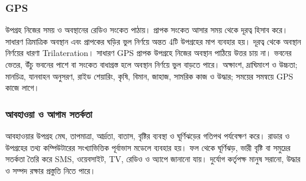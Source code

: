 \subsubsection{GPS}
উপগ্রহ নিজের সময় ও অবস্থানের রেডিও সংকেত পাঠায়। প্রাপক সংকেত আসার সময় থেকে দূরত্ব হিসাব করে। সাধারণ ত্রিমাত্রিক অবস্থান এবং প্রাপকের ঘড়ির ভুল নির্ণয়ে অন্তত 4টি উপগ্রহের মাপ ব্যবহার হয়। দূরত্ব থেকে অবস্থান নির্ণয়ের ধারণা Trilateration। সাধারণ GPS প্রাপক উপগ্রহে নিজের অবস্থান পাঠিয়ে উত্তর চায় না। ভবনের ভেতর, উঁচু ভবনের পাশে বা সংকেত বাধাগ্রস্ত হলে অবস্থান নির্ণয়ে ভুল বাড়তে পারে।
অক্ষাংশ, দ্রাঘিমাংশ ও উচ্চতা; মানচিত্র, যানবাহন অনুসরণ, রাইড শেয়ারিং, কৃষি, বিমান, জাহাজ, সামরিক কাজ ও উদ্ধার; সময়ের সমন্বয়ে GPS কাজে লাগে।
\subsubsection{আবহাওয়া ও আগাম সতর্কতা}
আবহাওয়ার উপগ্রহ মেঘ, তাপমাত্রা, আর্দ্রতা, বাতাস, বৃষ্টির ব্যবস্থা ও ঘূর্ণিঝড়ের গতিপথ পর্যবেক্ষণ করে। রাডার ও উপগ্রহের তথ্য কম্পিউটারের সংখ্যাভিত্তিক পূর্বাভাস মডেলে ব্যবহার হয়। ফল থেকে ঘূর্ণিঝড়, ভারী বৃষ্টি বা সমুদ্রের সতর্কতা তৈরি করে SMS, ওয়েবসাইট, TV, রেডিও ও অ্যাপে জানানো যায়। দুর্যোগ কর্তৃপক্ষ মানুষ সরানো, উদ্ধার ও সম্পদ রক্ষার প্রস্তুতি নিতে পারে।
